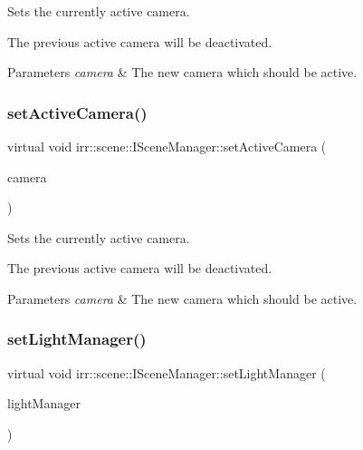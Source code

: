 Sets the currently active camera. 

The previous active camera will be deactivated. 
\begin{DoxyParams}{Parameters}
{\em camera} & The new camera which should be active. \\
\hline
\end{DoxyParams}
\mbox{\label{classirr_1_1scene_1_1ISceneManager_a5d19b7a6803a0a021082fc2b86043b3d}} 
\subsubsection{\texorpdfstring{set\+Active\+Camera()}{setActiveCamera()}\hspace{0.1cm}{\footnotesize\ttfamily [2/2]}}
{\footnotesize\ttfamily virtual void irr\+::scene\+::\+I\+Scene\+Manager\+::set\+Active\+Camera (\begin{DoxyParamCaption}\item[{\hyperlink{classirr_1_1scene_1_1ICameraSceneNode}{I\+Camera\+Scene\+Node} $\ast$}]{camera }\end{DoxyParamCaption})\hspace{0.3cm}{\ttfamily [pure virtual]}}



Sets the currently active camera. 

The previous active camera will be deactivated. 
\begin{DoxyParams}{Parameters}
{\em camera} & The new camera which should be active. \\
\hline
\end{DoxyParams}
\mbox{\label{classirr_1_1scene_1_1ISceneManager_a0065307bf3ff12fdc5b7bb624987a1c2}} 
\subsubsection{\texorpdfstring{set\+Light\+Manager()}{setLightManager()}\hspace{0.1cm}{\footnotesize\ttfamily [1/2]}}
{\footnotesize\ttfamily virtual void irr\+::scene\+::\+I\+Scene\+Manager\+::set\+Light\+Manager (\begin{DoxyParamCaption}\item[{\hyperlink{classirr_1_1scene_1_1ILightManager}{I\+Light\+Manager} $\ast$}]{light\+Manager }\end{DoxyParamCaption})\hspace{0.3cm}{\ttfamily [pure virtual]}}



